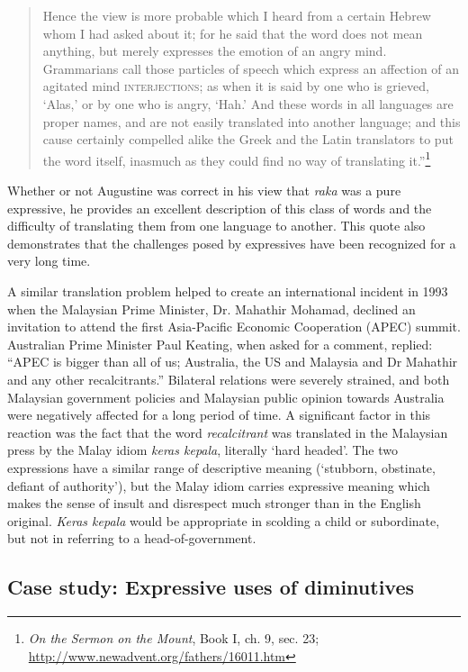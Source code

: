 \begin{quote}
Hence the view is more probable which I heard from a certain Hebrew whom I had asked about it; for he said that the word does not mean anything, but merely expresses the emotion of an angry mind. Grammarians call those particles of speech which express an affection of an agitated mind \textsc{interjections}; as when it is said by one who is grieved, ‘Alas,’ or by one who is angry, ‘Hah.’ And these words in all languages are proper names, and are not easily translated into another language; and this cause certainly compelled alike the Greek and the Latin translators to put the word itself, inasmuch as they could find no way of translating it.”\footnote{\textit{On the Sermon on the Mount}, Book I, ch. 9, sec. 23; \url{http://www.newadvent.org/fathers/16011.htm}} 
\end{quote}


Whether or not Augustine was correct in his view that \textit{raka} was a pure expressive, he provides an excellent description of this class of words and the difficulty of translating them from one language to another. This quote also demonstrates that the challenges posed by expressives have been recognized for a very long time.



A similar translation problem helped to create an international incident in 1993 when the Malaysian Prime Minister, Dr. Mahathir Mohamad, declined an invitation to attend the first Asia-Pacific Economic Cooperation (APEC) summit. Australian Prime Minister Paul Keating, when asked for a comment, replied: “APEC is bigger than all of us; Australia, the US and Malaysia and Dr Mahathir and any other recalcitrants.” Bilateral relations were severely strained, and both Malaysian government policies and Malaysian public opinion towards Australia were negatively affected for a long period of time. A significant factor in this reaction was the fact that the word \textit{recalcitrant} was translated in the Malaysian press by the Malay idiom \textit{keras kepala}, literally ‘hard headed’. The two expressions have a similar range of descriptive meaning (‘stubborn, obstinate, defiant of authority’), but the Malay idiom carries expressive meaning which makes the sense of insult and disrespect much stronger than in the English original. \textit{Keras kepala} would be appropriate in scolding a child or subordinate, but not in referring to a head-of-government.


\subsection{Case study: Expressive uses of diminutives}\label{sec:2.6.6}

